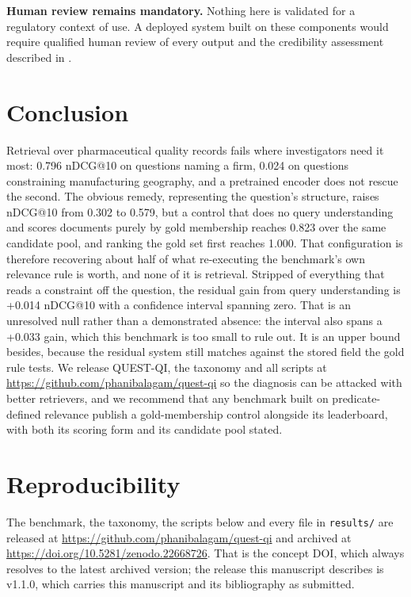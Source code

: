 \documentclass[acmsmall]{acmart}
\begin{document}
\textbf{Human review remains mandatory.} Nothing here is validated for a regulatory context of use. A deployed system built on these components would require qualified human review of every output and the credibility assessment described in \cite{fda_ai_credibility}.


\section{Conclusion}
Retrieval over pharmaceutical quality records fails where investigators need it most: 0.796 nDCG@10 on questions naming a firm, 0.024 on questions constraining manufacturing geography, and a pretrained encoder does not rescue the second. The obvious remedy, representing the question's structure, raises nDCG@10 from 0.302 to 0.579, but a control that does no query understanding and scores documents purely by gold membership reaches 0.823 over the same candidate pool, and ranking the gold set first reaches 1.000. That configuration is therefore recovering about half of what re-executing the benchmark's own relevance rule is worth, and none of it is retrieval. Stripped of everything that reads a constraint off the question, the residual gain from query understanding is +0.014 nDCG@10 with a confidence interval spanning zero. That is an unresolved null rather than a demonstrated absence: the interval also spans a +0.033 gain, which this benchmark is too small to rule out. It is an upper bound besides, because the residual system still matches against the stored field the gold rule tests. We release QUEST-QI, the taxonomy and all scripts at \url{https://github.com/phanibalagam/quest-qi} so the diagnosis can be attacked with better retrievers, and we recommend that any benchmark built on predicate-defined relevance publish a gold-membership control alongside its leaderboard, with both its scoring form and its candidate pool stated.


\section*{Reproducibility}
The benchmark, the taxonomy, the scripts below and every file in \texttt{results/} are released at \url{https://github.com/phanibalagam/quest-qi} and archived at \url{https://doi.org/10.5281/zenodo.22668726}. That is the concept DOI, which always resolves to the latest archived version; the release this manuscript describes is v1.1.0, which carries this manuscript and its bibliography as submitted.
\end{document}
